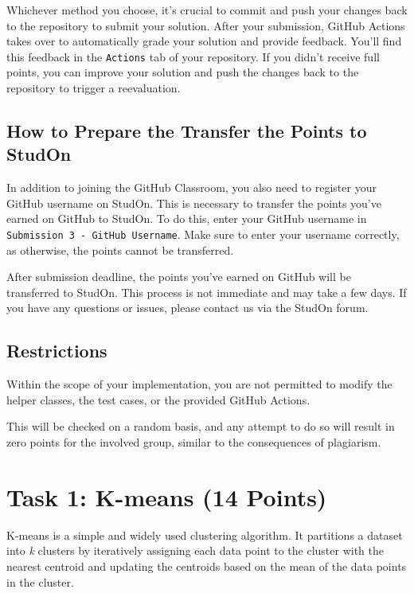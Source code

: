 \documentclass[
english,
smallborders
]{i6prcsht}
\newcommand{\points}[1]{\hfill \color{red}(#1 Points)\color{black}}
\begin{document}
Whichever method you choose, it's crucial to commit and push your changes back to the repository to submit your solution\footnotemark[\value{footnote}]. After your submission, GitHub Actions takes over to automatically grade your solution and provide feedback. You'll find this feedback in the \texttt{Actions} tab of your repository. If you didn't receive full points, you can improve your solution and push the changes back to the repository to trigger a reevaluation.

\subsection*{How to Prepare the Transfer the Points to StudOn}

In addition to joining the GitHub Classroom, you also need to register your GitHub username on StudOn. This is necessary to transfer the points you've earned on GitHub to StudOn. To do this, enter your GitHub username in \texttt{Submission 3 - GitHub Username}. Make sure to enter your username correctly, as otherwise, the points cannot be transferred.

After submission deadline, the points you've earned on GitHub will be transferred to StudOn. This process is not immediate and may take a few days. If you have any questions or issues, please contact us via the StudOn forum.

\subsection*{Restrictions}

Within the scope of your implementation, you are not permitted to modify the helper classes, the test cases, or the provided GitHub Actions.

This will be checked on a random basis, and any attempt to do so will result in zero points for the involved group, similar to the consequences of plagiarism.

\newpage

\section*{Task 1: K-means \points{14}}
\label{sec:task-one}

K-means is a simple and widely used clustering algorithm. It partitions a dataset into \textit{k} clusters by iteratively assigning each data point to the cluster with the nearest centroid and updating the centroids based on the mean of the data points in the cluster.
\end{document}
